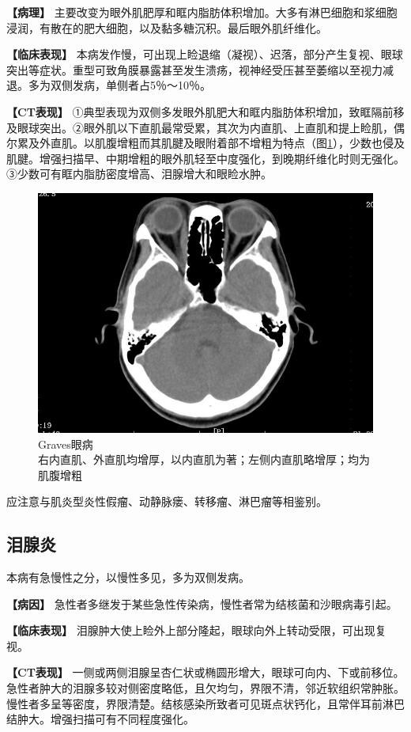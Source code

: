 \textbf{【病理】}
主要改变为眼外肌肥厚和眶内脂肪体积增加。大多有淋巴细胞和浆细胞浸润，有散在的肥大细胞，以及黏多糖沉积。最后眼外肌纤维化。

\textbf{【临床表现】}
本病发作慢，可出现上睑退缩（凝视）、迟落，部分产生复视、眼球突出等症状。重型可致角膜暴露甚至发生溃疡，视神经受压甚至萎缩以至视力减退。多为双侧发病，单侧者占5％～10％。

\textbf{【CT表现】}
①典型表现为双侧多发眼外肌肥大和眶内脂肪体积增加，致眶隔前移及眼球突出。②眼外肌以下直肌最常受累，其次为内直肌、上直肌和提上睑肌，偶尔累及外直肌。以肌腹增粗而其肌腱及眼附着部不增粗为特点（图\ref{fig3-4}），少数也侵及肌腱。增强扫描早、中期增粗的眼外肌轻至中度强化，到晚期纤维化时则无强化。③少数可有眶内脂肪密度增高、泪腺增大和眼睑水肿。

\begin{figure}[!htbp]
 \centering
 \includegraphics[width=.7\textwidth,height=\textheight,keepaspectratio]{./images/Image00100.jpg}
 \captionsetup{justification=centering}
 \caption{Graves眼病\\{\small 右内直肌、外直肌均增厚，以内直肌为著；左侧内直肌略增厚；均为肌腹增粗}}
 \label{fig3-4}
  \end{figure} 

应注意与肌炎型炎性假瘤、动静脉瘘、转移瘤、淋巴瘤等相鉴别。

\subsection{泪腺炎}

本病有急慢性之分，以慢性多见，多为双侧发病。

\textbf{【病因】}
急性者多继发于某些急性传染病，慢性者常为结核菌和沙眼病毒引起。

\textbf{【临床表现】}
泪腺肿大使上睑外上部分隆起，眼球向外上转动受限，可出现复视。

\textbf{【CT表现】}
一侧或两侧泪腺呈杏仁状或椭圆形增大，眼球可向内、下或前移位。急性者肿大的泪腺多较对侧密度略低，且欠均匀，界限不清，邻近软组织常肿胀。慢性者多呈等密度，界限清楚。结核感染所致者可见斑点状钙化，且常伴耳前淋巴结肿大。增强扫描可有不同程度强化。

